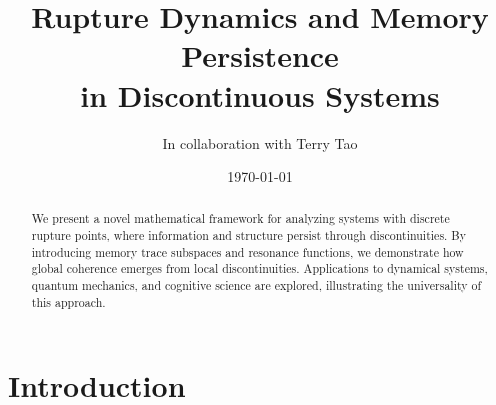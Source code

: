 \documentclass[12pt]{article}
\title{Rupture Dynamics and Memory Persistence\\in Discontinuous Systems}
\author{In collaboration with Terry Tao}
\date{\today}
\theoremstyle{plain}
\theoremstyle{definition}
\begin{document}
\maketitle

\begin{abstract}
We present a novel mathematical framework for analyzing systems with discrete rupture points, where information and structure persist through discontinuities. By introducing memory trace subspaces and resonance functions, we demonstrate how global coherence emerges from local discontinuities. Applications to dynamical systems, quantum mechanics, and cognitive science are explored, illustrating the universality of this approach.
\end{abstract}

\section{Introduction}
\end{document}
